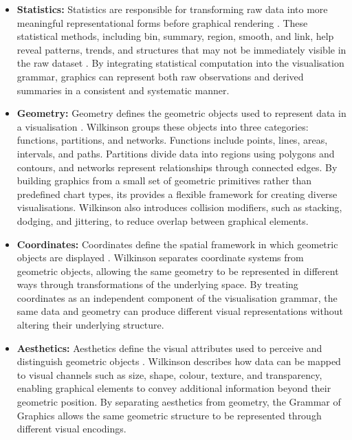\begin{itemize}
    \item \textbf{Statistics:} Statistics are responsible for transforming raw data into more meaningful representational forms before graphical rendering \cite{wilkinson2005grammar}. These statistical methods, including bin, summary, region, smooth, and link, help reveal patterns, trends, and structures that may not be immediately visible in the raw dataset \cite{wilkinson2005grammar}. By integrating statistical computation into the visualisation grammar, graphics can represent both raw observations and derived summaries in a consistent and systematic manner.

    \item \textbf{Geometry:} Geometry defines the geometric objects used to represent data in a visualisation \cite{wilkinson2005grammar}. Wilkinson groups these objects into three categories: functions, partitions, and networks. Functions include points, lines, areas, intervals, and paths. Partitions divide data into regions using polygons and contours, and networks represent relationships through connected edges. By building graphics from a small set of geometric primitives rather than predefined chart types, its provides a flexible framework for creating diverse visualisations. Wilkinson also introduces collision modifiers, such as stacking, dodging, and jittering, to reduce overlap between graphical elements.

    \item \textbf{Coordinates:} Coordinates define the spatial framework in which geometric objects are displayed \cite{wilkinson2005grammar}. Wilkinson separates coordinate systems from geometric objects, allowing the same geometry to be represented in different ways through transformations of the underlying space. By treating coordinates as an independent component of the visualisation grammar, the same data and geometry can produce different visual representations without altering their underlying structure.

    \item \textbf{Aesthetics:} Aesthetics define the visual attributes used to perceive and distinguish geometric objects \cite{wilkinson2005grammar}. Wilkinson describes how data can be mapped to visual channels such as size, shape, colour, texture, and transparency, enabling graphical elements to convey additional information beyond their geometric position. By separating aesthetics from geometry, the Grammar of Graphics allows the same geometric structure to be represented through different visual encodings.

\end{itemize}

